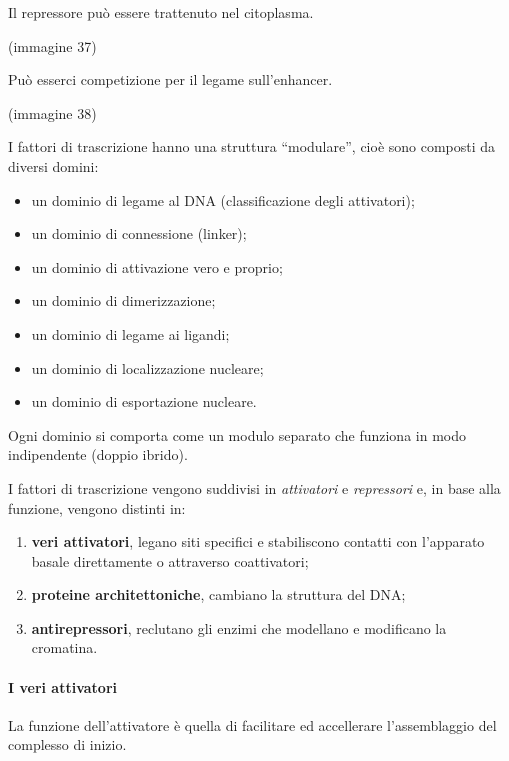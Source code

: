 \documentclass[11pt]{book}
\begin{document}
Il repressore può essere trattenuto nel citoplasma.

(immagine 37)

Può esserci competizione per il legame sull'enhancer.

(immagine 38)

I fattori di trascrizione hanno una struttura ``modulare'', cioè sono
composti da diversi domini:

\begin{itemize}
\itemsep1pt\parskip0pt
\item
  un dominio di legame al DNA (classificazione degli attivatori);
\item
  un dominio di connessione (linker);
\item
  un dominio di attivazione vero e proprio;
\item
  un dominio di dimerizzazione;
\item
  un dominio di legame ai ligandi;
\item
  un dominio di localizzazione nucleare;
\item
  un dominio di esportazione nucleare.
\end{itemize}

Ogni dominio si comporta come un modulo separato che funziona in modo
indipendente (doppio ibrido).

I fattori di trascrizione vengono suddivisi in \emph{attivatori} e
\emph{repressori} e, in base alla funzione, vengono distinti in:

\begin{enumerate}
\def\labelenumi{\arabic{enumi}.}
\itemsep1pt\parskip0pt
\item
  \textbf{veri attivatori}, legano siti specifici e stabiliscono
  contatti con l'apparato basale direttamente o attraverso coattivatori;
\item
  \textbf{proteine architettoniche}, cambiano la struttura del DNA;
\item
  \textbf{antirepressori}, reclutano gli enzimi che modellano e
  modificano la cromatina.
\end{enumerate}

\paragraph{I veri attivatori}\label{i-veri-attivatori}

La funzione dell'attivatore è quella di facilitare ed accellerare
l'assemblaggio del complesso di inizio.
\end{document}
